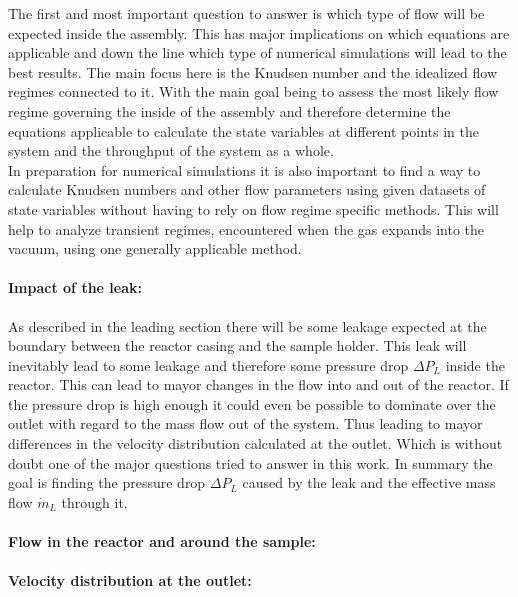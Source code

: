 	The first and most important question to answer is which type of flow will be expected inside the assembly.
	This has major implications on which equations are applicable and down the line which type of numerical simulations will lead to the best results.
	The main focus here is the Knudsen number and the idealized flow regimes connected to it.
	With the main goal being to assess the most likely flow regime governing the inside of the assembly and therefore determine the equations applicable to calculate the state variables at different points in the system and the throughput of the system as a whole.\\
	In preparation for numerical simulations it is also important to find a way to calculate Knudsen numbers and other flow parameters using given datasets of state variables without having to rely on flow regime specific methods. This will help to analyze transient regimes, encountered when the gas expands into the vacuum, using one generally applicable method.  

\paragraph{Impact of the leak:}

	As described in the leading section there will be some leakage expected at the boundary between the reactor casing and the sample holder.
	This leak will inevitably lead to some leakage and therefore some pressure drop $\Delta P_L$ inside the reactor.
	This can lead to mayor changes in the flow into and out of the reactor.
	If the pressure drop is high enough it could even be possible to dominate over the outlet with regard to the mass flow out of the system.
	Thus leading to mayor differences in the velocity distribution calculated at the outlet.
	Which is without doubt one of the major questions tried to answer in this work.
	In summary the goal is finding the pressure drop $\Delta P_L$ caused by the leak and the effective mass flow $\dot{m}_L$ through it.
	
\paragraph{Flow in the reactor and around the sample:}

\paragraph{Velocity distribution at the outlet:}
